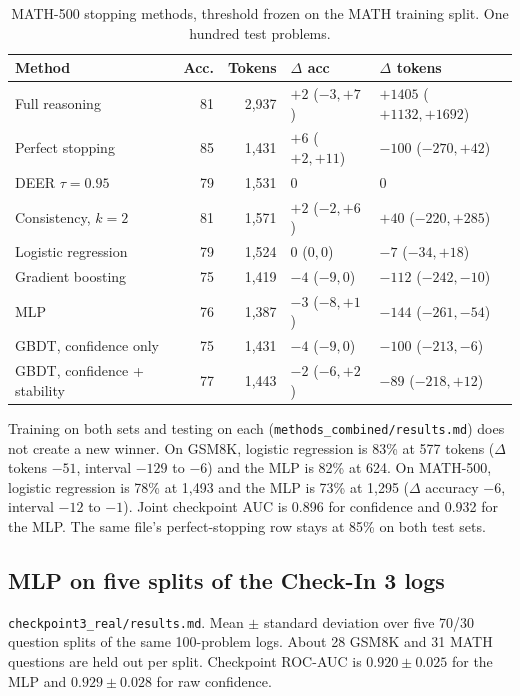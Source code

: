 \begin{table}[!t]
\caption{MATH-500 stopping methods, threshold frozen on the MATH training split. One hundred test problems.}
\label{tab:meth-math}
\centering
\scriptsize
\begin{tabular}{@{}lrrll@{}}
\toprule
Method & Acc. & Tokens & $\Delta$ acc & $\Delta$ tokens \\
\midrule
Full reasoning & 81 & 2{,}937 & $+2$ ($-3,+7$) & $+1405$ ($+1132,+1692$) \\
Perfect stopping & 85 & 1{,}431 & $+6$ ($+2,+11$) & $-100$ ($-270,+42$) \\
DEER $\tau=0.95$ & 79 & 1{,}531 & 0 & 0 \\
Consistency, $k=2$ & 81 & 1{,}571 & $+2$ ($-2,+6$) & $+40$ ($-220,+285$) \\
Logistic regression & 79 & 1{,}524 & $0$ ($0,0$) & $-7$ ($-34,+18$) \\
Gradient boosting & 75 & 1{,}419 & $-4$ ($-9,0$) & $-112$ ($-242,-10$) \\
MLP & 76 & 1{,}387 & $-3$ ($-8,+1$) & $-144$ ($-261,-54$) \\
GBDT, confidence only & 75 & 1{,}431 & $-4$ ($-9,0$) & $-100$ ($-213,-6$) \\
GBDT, confidence + stability & 77 & 1{,}443 & $-2$ ($-6,+2$) & $-89$ ($-218,+12$) \\
\bottomrule
\end{tabular}
\end{table}

Training on both sets and testing on each (\texttt{methods\_combined/results.md}) does not create a new winner.
On GSM8K, logistic regression is 83\% at 577 tokens ($\Delta$ tokens $-51$, interval $-129$ to $-6$) and the MLP is 82\% at 624.
On MATH-500, logistic regression is 78\% at 1{,}493 and the MLP is 73\% at 1{,}295 ($\Delta$ accuracy $-6$, interval $-12$ to $-1$).
Joint checkpoint AUC is 0.896 for confidence and 0.932 for the MLP.
The same file's perfect-stopping row stays at 85\% on both test sets.

\clearpage
\subsection{MLP on five splits of the Check-In 3 logs}
\texttt{checkpoint3\_real/results.md}.
Mean $\pm$ standard deviation over five 70/30 question splits of the same 100-problem logs.
About 28 GSM8K and 31 MATH questions are held out per split.
Checkpoint ROC-AUC is $0.920\pm 0.025$ for the MLP and $0.929\pm 0.028$ for raw confidence.

